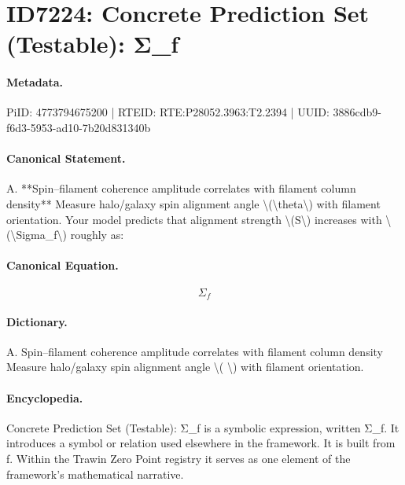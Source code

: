 \section*{ID7224: Concrete Prediction Set (Testable): Σ\_f}
\paragraph{Metadata.}
PiID: 4773794675200 | RTEID: RTE:P28052.3963:T2.2394 | UUID: 3886cdb9-f6d3-5953-ad10-7b20d831340b

\paragraph{Canonical Statement.}
A. **Spin–filament coherence amplitude correlates with filament column density** Measure halo/galaxy spin alignment angle \textbackslash{}(\textbackslash{}theta\textbackslash{}) with filament orientation. Your model predicts that alignment strength \textbackslash{}(S\textbackslash{}) increases with \textbackslash{}(\textbackslash{}Sigma\_f\textbackslash{}) roughly as:

\paragraph{Canonical Equation.}
\[
\Sigma_f
\]

\paragraph{Dictionary.}
A. Spin–filament coherence amplitude correlates with filament column density Measure halo/galaxy spin alignment angle \textbackslash{}( \textbackslash{}) with filament orientation.

\paragraph{Encyclopedia.}
Concrete Prediction Set (Testable): Σ\_f is a symbolic expression, written Σ\_f. It introduces a symbol or relation used elsewhere in the framework. It is built from f. Within the Trawin Zero Point registry it serves as one element of the framework's mathematical narrative.
